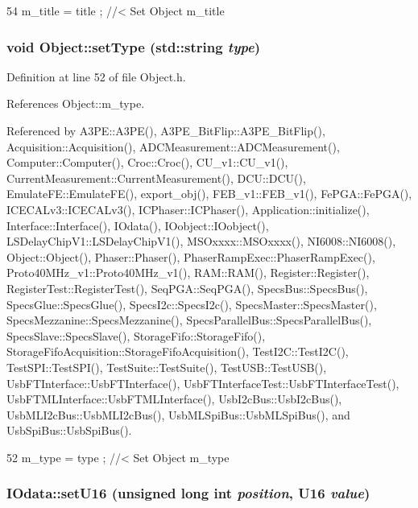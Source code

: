 \begin{DoxyCode}
54 { m_title = title ; } //< Set Object m_title
\end{DoxyCode}
\hypertarget{classObject_aae534cc9d982bcb9b99fd505f2e103a5}{
\subsubsection[{setType}]{\setlength{\rightskip}{0pt plus 5cm}void Object::setType (std::string {\em type})}}
\label{classObject_aae534cc9d982bcb9b99fd505f2e103a5}


Definition at line 52 of file Object.h.

References Object::m\_\-type.

Referenced by A3PE::A3PE(), A3PE\_\-BitFlip::A3PE\_\-BitFlip(), Acquisition::Acquisition(), ADCMeasurement::ADCMeasurement(), Computer::Computer(), Croc::Croc(), CU\_\-v1::CU\_\-v1(), CurrentMeasurement::CurrentMeasurement(), DCU::DCU(), EmulateFE::EmulateFE(), export\_\-obj(), FEB\_\-v1::FEB\_\-v1(), FePGA::FePGA(), ICECALv3::ICECALv3(), ICPhaser::ICPhaser(), Application::initialize(), Interface::Interface(), IOdata(), IOobject::IOobject(), LSDelayChipV1::LSDelayChipV1(), MSOxxxx::MSOxxxx(), NI6008::NI6008(), Object::Object(), Phaser::Phaser(), PhaserRampExec::PhaserRampExec(), Proto40MHz\_\-v1::Proto40MHz\_\-v1(), RAM::RAM(), Register::Register(), RegisterTest::RegisterTest(), SeqPGA::SeqPGA(), SpecsBus::SpecsBus(), SpecsGlue::SpecsGlue(), SpecsI2c::SpecsI2c(), SpecsMaster::SpecsMaster(), SpecsMezzanine::SpecsMezzanine(), SpecsParallelBus::SpecsParallelBus(), SpecsSlave::SpecsSlave(), StorageFifo::StorageFifo(), StorageFifoAcquisition::StorageFifoAcquisition(), TestI2C::TestI2C(), TestSPI::TestSPI(), TestSuite::TestSuite(), TestUSB::TestUSB(), UsbFTInterface::UsbFTInterface(), UsbFTInterfaceTest::UsbFTInterfaceTest(), UsbFTMLInterface::UsbFTMLInterface(), UsbI2cBus::UsbI2cBus(), UsbMLI2cBus::UsbMLI2cBus(), UsbMLSpiBus::UsbMLSpiBus(), and UsbSpiBus::UsbSpiBus().


\begin{DoxyCode}
52 { m_type  = type  ; } //< Set Object m_type
\end{DoxyCode}
\hypertarget{classIOdata_aa9ade5ce3944c8e2b831533b6f876caf}{
\subsubsection[{setU16}]{ IOdata::setU16 (unsigned long int {\em position}, \/  {\bf U16} {\em value})}}
\label{classIOdata_aa9ade5ce3944c8e2b831533b6f876caf}


